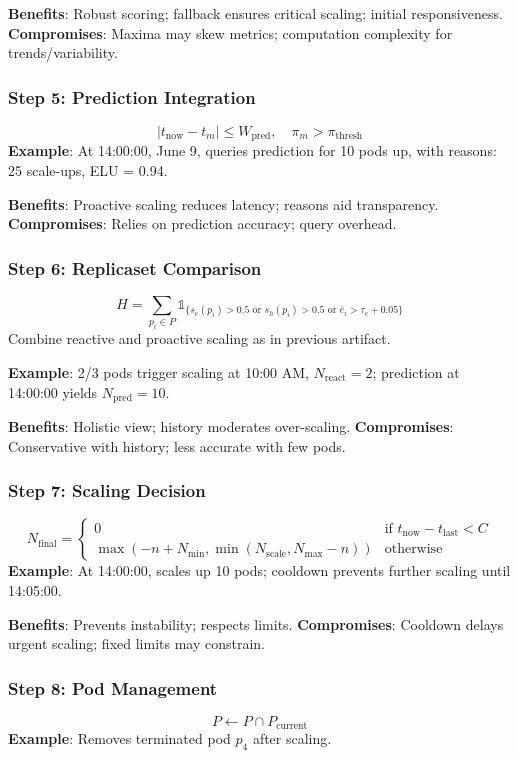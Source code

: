 \documentclass[12pt]{article}
\begin{document}
\textbf{Benefits}: Robust scoring; fallback ensures critical scaling; initial responsiveness.
\textbf{Compromises}: Maxima may skew metrics; computation complexity for trends/variability.

\subsubsection{Step 5: Prediction Integration}
\[
|t_{\text{now}} - t_m| \leq W_{\text{pred}}, \quad \pi_m > \pi_{\text{thresh}}
\]
\textbf{Example}: At 14:00:00, June 9, queries prediction for 10 pods up, with reasons: 25 scale-ups, ELU = 0.94.

\textbf{Benefits}: Proactive scaling reduces latency; reasons aid transparency.
\textbf{Compromises}: Relies on prediction accuracy; query overhead.

\subsubsection{Step 6: Replicaset Comparison}
\[
H = \sum_{p_i \in P} \mathbb{1}_{\{s_e(p_i) > 0.5 \text{ or } s_h(p_i) > 0.5 \text{ or } \bar{e}_i > \tau_e + 0.05\}}
\]
Combine reactive and proactive scaling as in previous artifact.

\textbf{Example}: 2/3 pods trigger scaling at 10:00 AM, \( N_{\text{react}} = 2 \); prediction at 14:00:00 yields \( N_{\text{pred}} = 10 \).

\textbf{Benefits}: Holistic view; history moderates over-scaling.
\textbf{Compromises}: Conservative with history; less accurate with few pods.

\subsubsection{Step 7: Scaling Decision}
\[
N_{\text{final}} = \begin{cases} 
0 & \text{if } t_{\text{now}} - t_{\text{last}} < C \\
\max(-n + N_{\text{min}}, \min(N_{\text{scale}}, N_{\text{max}} - n)) & \text{otherwise}
\end{cases}
\]
\textbf{Example}: At 14:00:00, scales up 10 pods; cooldown prevents further scaling until 14:05:00.

\textbf{Benefits}: Prevents instability; respects limits.
\textbf{Compromises}: Cooldown delays urgent scaling; fixed limits may constrain.

\subsubsection{Step 8: Pod Management}
\[
P \gets P \cap P_{\text{current}}
\]
\textbf{Example}: Removes terminated pod $p_4$ after scaling.
\end{document}
